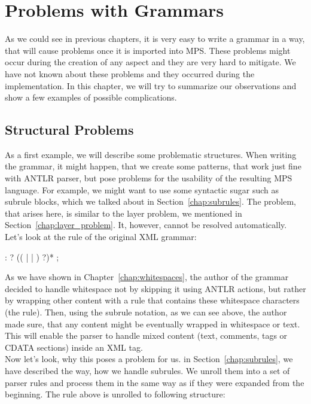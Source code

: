 \chapter{Problems with Grammars}
\label{chap:problems_with_grammars}

As we could see in previous chapters, it is very easy to write a grammar in a way, that will cause problems once it is imported into MPS.
These problems might occur during the creation of any aspect and they are very hard to mitigate.
We have not known about these problems and they occurred during the implementation.
In this chapter, we will try to summarize our observations and show a few examples of possible complications.
\\

\section{Structural Problems}

As a first example, we will describe some problematic structures.
When writing the grammar, it might happen, that we create some patterns, that work just fine with ANTLR parser, but pose problems for the usability of the resulting MPS language.
For example, we might want to use some syntactic sugar such as subrule blocks, which we talked about in Section~\ref{chap:subrules}.
The problem, that arises here, is similar to the layer problem, we mentioned in Section~\ref{chap:layer_problem}.
It, however, cannot be resolved automatically.
Let's look at the  rule of the original XML grammar:

\begin{antlr}
	 :   ? (( |  | ) ?)* ;
\end{antlr}

As we have shown in Chapter~\ref{chap:whitespaces}, the author of the grammar decided to handle whitespace not by skipping it using ANTLR actions, but rather by wrapping other content with a rule that contains these whitespace characters (the  rule).
Then, using the subrule notation, as we can see above, the author made sure, that any content might be eventually wrapped in whitespace or text.
This will enable the parser to handle mixed content (text, comments, tags or CDATA sections) inside an XML tag.
\\

Now let's look, why this poses a problem for us.
in Section~\ref{chap:subrules}, we have described the way, how we handle subrules.
We unroll them into a set of parser rules and process them in the same way as if they were expanded from the beginning.
The rule above is unrolled to following structure:

